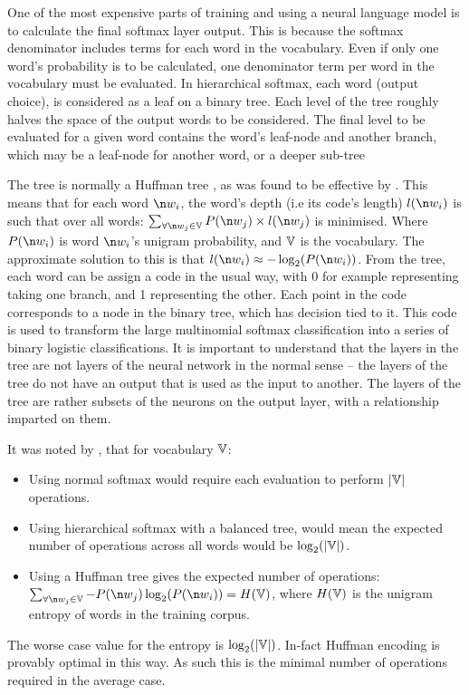 {One of the most expensive parts of training and using a neural language model is  to calculate the final softmax layer output.
This is because the softmax denominator includes terms for each word in the vocabulary.
Even if only one word's probability is to be calculated, one denominator term per word in the vocabulary must be evaluated.
In hierarchical softmax, each word (output choice), is considered as a leaf on a binary tree.
Each level of the tree roughly halves the space of the output words to be considered.
The final level to be evaluated for a given word contains the word's leaf-node and another branch, which may be a leaf-node for another word, or a deeper sub-tree

The tree is normally a Huffman tree , as was found to be effective by \textcite{mikolov2013efficient}.
This means that for each word $\n w_i$, the word's depth (i.e its code's length) $l(\n w_i)$ is such that over all words:
 $\sum_{\forall \n w_j \in \set{V}} P(\n w_j)\times l(\n w_j)$ is minimised.
Where $P(\n w_i)$ is word $\n w_i$'s unigram probability, and $\mathbb{V}$ is the vocabulary.
The approximate solution to this is that $l(\n w_i) \approx -\log_2(P(\n w_i))$.
From the tree, each word can be assign a code in the usual way, with 0 for example representing taking one branch, and 1 representing the other.
Each point in the code corresponds to a node in the binary tree, which has decision tied to it.
This code is used to transform the large  multinomial softmax classification into a series of binary logistic classifications.
It is important to understand that the layers in the tree are not layers of the neural network in the normal sense -- the layers of the tree do not have an output that is used as the input to another.
The layers of the tree are rather subsets of the neurons on the output layer, with a relationship imparted on them.

It was noted by \textcite{mikolov2013efficient}, that for vocabulary $\mathbb{V}$:
\begin{itemize}
	\item Using normal softmax would require each evaluation to perform $|\mathbb{V}|$ operations.
	\item Using hierarchical softmax with a balanced tree, would mean the expected number of operations across all words would be $\log_2(|\mathbb{V}|)$.
	\item Using a Huffman tree gives the expected number of operations:\\ $\sum_{\forall \n w_j \in \set{V}} -P(\n w_j)\log_2(P(\n w_i)) = H(\set{V})$, where $H(\mathbb{V})$ is the unigram entropy of words in the training corpus.
\end{itemize}
The worse case value for the entropy is $\log_2(|\mathbb{V}|)$.
In-fact Huffman encoding is provably optimal in this way.
As such this is the minimal number of operations required in the average case.


}
